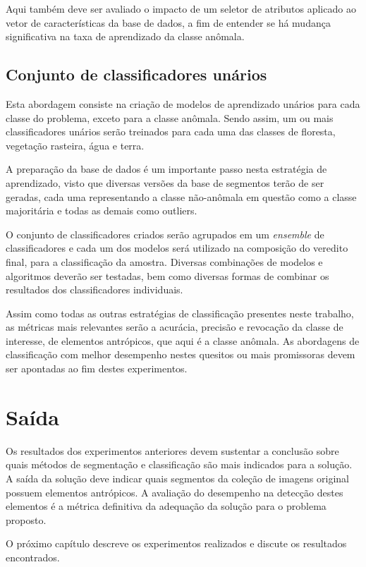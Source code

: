 Aqui também deve ser avaliado o impacto de um seletor de atributos aplicado ao vetor de características da base de dados, a fim de entender se há mudança significativa na taxa de aprendizado da classe anômala.

\subsection{Conjunto de classificadores unários}

Esta abordagem consiste na criação de modelos de aprendizado unários para cada classe do problema, exceto para a classe anômala. Sendo assim, um ou mais classificadores unários serão treinados para cada uma das classes de floresta, vegetação rasteira, água e terra.

A preparação da base de dados é um importante passo nesta estratégia de aprendizado, visto que diversas versões da base de segmentos terão de ser geradas, cada uma representando a classe não-anômala em questão como a classe majoritária e todas as demais como outliers.

O conjunto de classificadores criados serão agrupados em um \textit{ensemble} de classificadores e cada um dos modelos será utilizado na composição do veredito final, para a classificação da amostra. Diversas combinações de modelos e algoritmos deverão ser testadas, bem como diversas formas de combinar os resultados dos classificadores individuais.

Assim como todas as outras estratégias de classificação presentes neste trabalho, as métricas mais relevantes serão a acurácia, precisão e revocação da classe de interesse, de elementos antrópicos, que aqui é a classe anômala. As abordagens de classificação com melhor desempenho nestes quesitos ou mais promissoras devem ser apontadas ao fim destes experimentos.

\section{Saída}

 Os resultados dos experimentos anteriores devem sustentar a conclusão sobre quais métodos de segmentação e classificação são mais indicados para a solução. A saída da solução deve indicar quais segmentos da coleção de imagens original possuem elementos antrópicos. A avaliação do desempenho na detecção destes elementos é a métrica definitiva da adequação da solução para o problema proposto.

O próximo capítulo descreve os experimentos realizados e discute os resultados encontrados.